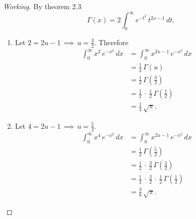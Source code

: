 \documentclass[12pt,a4paper]{report}
\theoremstyle{definition}
\theoremstyle{plain}
\begin{document}
\begin{proof}[Working]
By theorem 2.3 $$\Gamma(x) = 2\int_0^{\infty} e^{-t^2}\, t^{2x - 1}\, dt.$$
\begin{enumerate}
\item[(a).] Let $2 = 2u -1 \, \implies\, u = \frac{3}{2}$. Therefore 
\begin{align*}
\int_0^{\infty} x^2\, e^{-x^2}\, dx & = \int_0^{\infty} x^{2u-1}\, e^{-x^2}\, dx\\
                                    & = \frac{1}{2}\, \Gamma(u)\\
                                    & = \frac{1}{2}\, \Gamma\left(\frac{3}{2}\right)\\
                                    & = \frac{1}{2}\, \cdot\, \frac{1}{2}\, \Gamma\left(\frac{1}{2}\right)\\
                                    & = \frac{1}{4}\, \sqrt{\pi}.
\end{align*}

\item[(b).] Let $4 = 2u-1\, \implies\, u = \frac{5}{2}.$
\begin{align*}
\int_0^{\infty}x^4\, e^{-x^2}\, dx & = \int_0^{\infty} x^{2u-1}\, e^{-x^2}\, dx\\
                                   & = \frac{1}{2}\, \Gamma\left(\frac{5}{2}\right)\\
                                   & = \frac{1}{2}\, \cdot\, \frac{3}{2}\, \Gamma\left(\frac{3}{2}\right)\\
                                   & = \frac{1}{2}\, \cdot\, \frac{3}{2}\, \cdot \, \frac{1}{2}\, \Gamma\left(\frac{1}{2}\right)\\
                                   & = \frac{3}{8}\, \sqrt{\pi}.
\end{align*}
\end{enumerate}
\end{proof}
\end{document}
